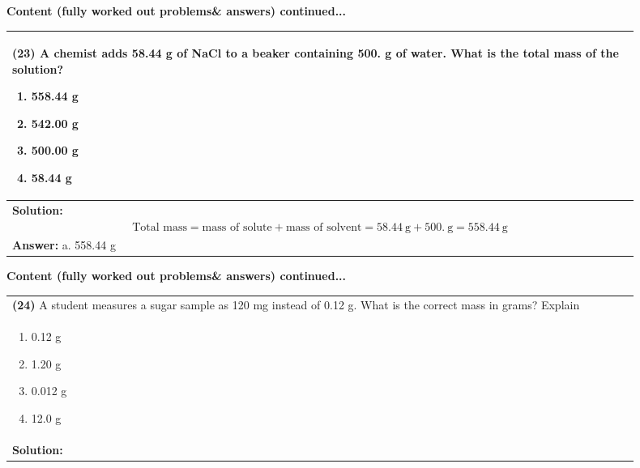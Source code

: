 \documentclass{article}
\begin{document}
{{\newpage
\noindent
{\large\textbf{Content (fully worked out problems& answers) continued...}\\[0.2em]
\vspace{0.2cm}
\begin{tabular}{|p{0.9\linewidth}|}
\hline
\vspace{0.2cm}
\textbf{(23)} A chemist adds 58.44 g of NaCl to a beaker containing 500. g of water. What is the total mass of the solution?
\begin{minipage}[t]{0.85\linewidth}
\begin{enumerate}[label=\alph*.]
   \item 558.44 g
   \item 542.00 g
   \item 500.00 g
   \item 58.44 g
\end{enumerate}
\end{minipage}\\
\hline
\vspace{0.2cm}
\textbf{Solution:} \\

\[
\text{Total mass} = \text{mass of solute} + \text{mass of solvent} = 58.44~\text{g} + 500.~\text{g} = 558.44~\text{g}
\] \\ 
\hline
\vspace{0.2cm}
\textbf{Answer:} a. 558.44 g \\
\hline
\end{tabular}  

\newpage
\noindent
{\large\textbf{Content (fully worked out problems& answers) continued...}\\[0.2em]
\vspace{0.2cm}
\begin{tabular}{|p{0.9\linewidth}|}
\hline
\vspace{0.2cm}
\textbf{(24)} A student measures a sugar sample as 120 mg instead of 0.12 g. What is the correct mass in grams? Explain \\
\begin{minipage}[t]{0.85\linewidth}
\begin{enumerate}[label=\alph*.]
   \item 0.12 g
   \item 1.20 g
   \item 0.012 g
   \item 12.0 g
\end{enumerate}
\end{minipage}\\
\hline
\vspace{0.2cm}
\textbf{Solution:} \\


\end{tabular}}}}}
\end{document}
